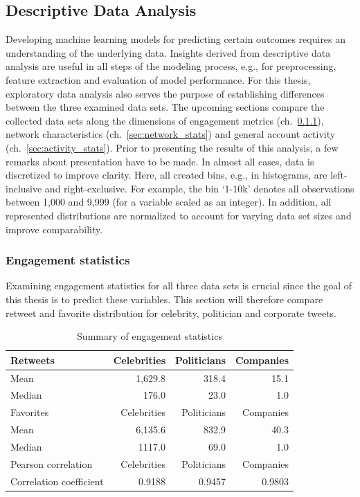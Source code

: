 \subsection{Descriptive Data Analysis}
\label{sec:dda}

Developing machine learning models for predicting certain outcomes requires
an understanding of the underlying data.
Insights derived from descriptive data analysis are useful in all steps of the
modeling process, e.g., for preprocessing, feature extraction and evaluation
of model performance.
For this thesis, exploratory data analysis also serves the purpose of establishing
differences between the three examined data sets.
The upcoming sections compare the collected data sets along the dimensions of
engagement metrics (ch.~\ref{sec:engagement_stats}), network characteristics
(ch.~\ref{sec:network_stats}) and general account activity (ch.~\ref{sec:activity_stats}).
Prior to presenting the results of this analysis, a few remarks about presentation
have to be made.
In almost all cases, data is discretized to improve clarity.
Here, all created bins, e.g., in histograms, are left-inclusive and right-exclusive.
For example, the bin `1-10k' denotes all observations between 1,000 and
9,999 (for a variable scaled as an integer).
In addition, all represented distributions are normalized to account for varying
data set sizes and improve comparability.

\subsubsection{Engagement statistics}
\label{sec:engagement_stats}

Examining engagement statistics for all three data sets is crucial since the goal
of this thesis is to predict these variables.
This section will therefore compare retweet and favorite distribution for 
celebrity, politician and corporate tweets.

\begin{table}
\centering
\begin{tabular}{lrrr}
\toprule
Retweets & Celebrities & Politicians & Companies \\
\midrule
Mean & 1,629.8 & 318.4 & 15.1 \\
Median & 176.0 & 23.0 & 1.0 \\
\midrule
Favorites & Celebrities & Politicians & Companies \\
\midrule
Mean & 6,135.6 & 832.9 & 40.3 \\
Median & 1117.0 & 69.0 & 1.0 \\
\midrule
Pearson correlation & Celebrities & Politicians & Companies \\
\midrule
Correlation coefficient & 0.9188 & 0.9457 & 0.9803 \\
\bottomrule
\end{tabular}
\caption{Summary of engagement statistics}
\label{tab:engagement_summary}
\end{table}

